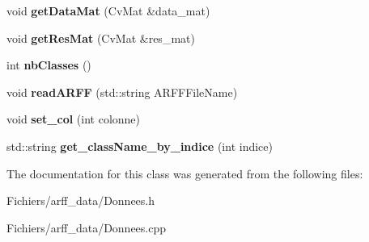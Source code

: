 \begin{DoxyCompactItemize}
\item 
\hypertarget{class_donnees_afc3bc399487042284b8bc40d2c14d899}{
void {\bfseries getDataMat} (CvMat \&data\_\-mat)}
\label{class_donnees_afc3bc399487042284b8bc40d2c14d899}

\item 
\hypertarget{class_donnees_a7cbd4e8d14c43cbc4ef862d7290e2fb4}{
void {\bfseries getResMat} (CvMat \&res\_\-mat)}
\label{class_donnees_a7cbd4e8d14c43cbc4ef862d7290e2fb4}

\item 
\hypertarget{class_donnees_ad71a25fe8b8d97e05e8cf03cad367d4c}{
int {\bfseries nbClasses} ()}
\label{class_donnees_ad71a25fe8b8d97e05e8cf03cad367d4c}

\item 
\hypertarget{class_donnees_a4b1aa9de02dfb139fc94479c9cefeb80}{
void {\bfseries readARFF} (std::string ARFFFileName)}
\label{class_donnees_a4b1aa9de02dfb139fc94479c9cefeb80}

\item 
\hypertarget{class_donnees_ae9d9757e9c916f79f7b64ff65480043b}{
void {\bfseries set\_\-col} (int colonne)}
\label{class_donnees_ae9d9757e9c916f79f7b64ff65480043b}

\item 
\hypertarget{class_donnees_a0e6b8adeefc574e25782a5e1f66b801d}{
std::string {\bfseries get\_\-className\_\-by\_\-indice} (int indice)}
\label{class_donnees_a0e6b8adeefc574e25782a5e1f66b801d}

\end{DoxyCompactItemize}


The documentation for this class was generated from the following files:\begin{DoxyCompactItemize}
\item 
Fichiers/arff\_\-data/Donnees.h\item 
Fichiers/arff\_\-data/Donnees.cpp\end{DoxyCompactItemize}
